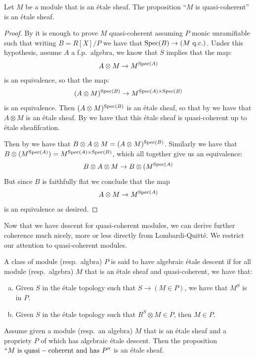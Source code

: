 \begin{lemma}\label{descent-quasicoherent}
Let $M$ be a module that is an \'etale sheaf. The proposition ``$M$ is quasi-coherent'' is an \'etale sheaf.
\end{lemma}

\begin{proof}
By  it is enough to prove $M$ quasi-coherent assuming $P$ monic unramifiable such that writing $B=R[X]/P$ we have that $\Spec(B)\to (M\ \mathrm{q.c.})$. Under this hypothesis, assume $A$ a f.p.\ algebra, we know that $S$ implies that the map:
\[A\otimes M\to M^{\operatorname{Spec}(A)}\] 
is an equivalence, so that the map:
\[(A\otimes M)^{\operatorname{Spec}(B)}\to M^{\operatorname{Spec}(A)\times\operatorname{Spec}(B)}\]
is an equivalence. Then $(A\otimes M)^{\operatorname{Spec}(B)}$ is an \'etale sheaf, so that by  we have that $A\otimes M$ is an \'etale sheaf. By  we have that this \'etale sheaf is quasi-coherent up to \'etale sheafifcation. 

Then by  we have that $B\otimes A\otimes M = (A\otimes M)^{\operatorname{Spec}(B)}$. Similarly we have that $B\otimes (M^{\operatorname{Spec}(A)}) = M^{\operatorname{Spec}(A)\times\operatorname{Spec}(B)}$, which all together give us an equivalence:
\[B\otimes A\otimes M \to B\otimes (M^{\operatorname{Spec}(A)}\]
But since $B$ is faithfully flat we conclude that the map 
\[A\otimes M\to M^{\operatorname{Spec}(A)}\]
is an equivalence as desired.
\end{proof}

Now that we have descent for quasi-coherent modules, we can derive further coherence much nicely, more or less directly from Lombardi-Quitt\'e. We restrict our attention to quasi-coherent modules. 

\begin{definition}
A class of module (resp.\ algbra) $P$ is said to have algebraic \'etale descent if for all module (resp.\ algebra) $M$ that is an \'etale sheaf and quasi-coherent, we have that:
\begin{enumerate}[(a)]
\item Given $S$ in the \'etale topology such that $S\to (M\in P)$, we have that $M^S$ is in $P$.
\item Given $S$ in the \'etale topology such that $R^S\otimes M\in P$, then $M\in P$.
\end{enumerate}
\end{definition}

\begin{lemma}\label{algebraic-descent-gives-descent}
Assume given a module (resp.\ an algebra) $M$ that is an \'etale sheaf and a propriety $P$ of which has algebraic \'etale descent. Then the proposition $``M\ \mathrm{is\ quasi-coherent\ and\ has}\ P''$ is an \'etale sheaf.
\end{lemma}


